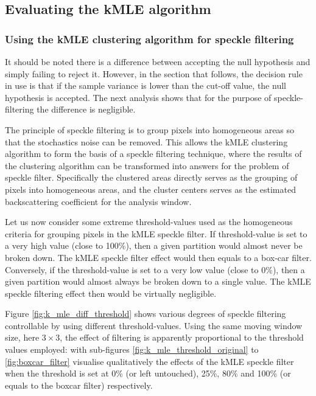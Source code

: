 \subsection{Evaluating the kMLE algorithm}
\label{sec:k_mle_result}

\subsubsection{Using the kMLE clustering algorithm for speckle filtering}

It should be noted there is a difference between accepting the null hypothesis and simply failing to reject it. 
However, in the section that follows, the decision rule in use is that if the sample variance is lower than the cut-off value, the null hypothesis is accepted. 
The next analysis shows that for the purpose of speckle-filtering the difference is negligible. 

The principle of speckle filtering is to group pixels into homogeneous areas so that the stochastics noise can be removed.
This allows the kMLE clustering algorithm to form the basis of a speckle filtering technique,
  where the results of the clustering algorithm can be transformed into answers for the problem of speckle filter.
Specifically the clustered areas directly serves as the grouping of pixels into homogeneous areas, and the cluster centers serves as the estimated backscattering coefficient for the analysis window.

Let us now consider some extreme threshold-values used as the homogeneous criteria for grouping pixels in the kMLE speckle filter.
If threshold-value is set to a very high value (close to 100\%), then a given partition would almost never be broken down.
The kMLE speckle filter effect would then equals to a box-car filter. 
Conversely, if the threshold-value is set to a very low value (close to 0\%), then a given partition would almost always be broken down to a single value.
The kMLE speckle filtering effect then would be virtually negligible.

Figure \ref{fig:k_mle_diff_threshold} shows various degrees of speckle filtering controllable by using different threshold-values.
Using the same moving window size, here $3\times3$, the effect of filtering is apparently proportional to the threshold values employed:
  with sub-figures \ref{fig:k_mle_threshold_original} to \ref{fig:boxcar_filter} visualise qualitatively the effects of the kMLE speckle filter when the threshold is set at 0\% (or left untouched), 25\%, 80\% and 100\% (or equals to the boxcar filter) respectively. 

